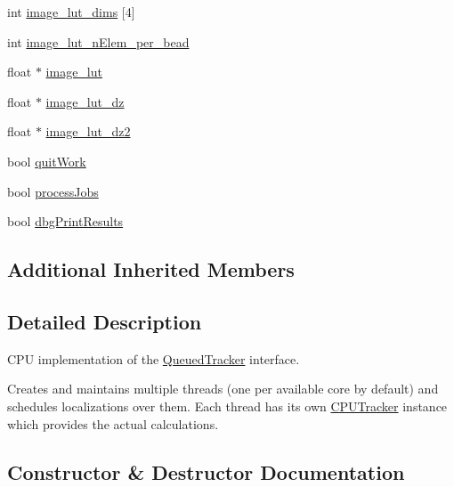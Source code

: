 \begin{DoxyCompactItemize}
\item 
int \hyperlink{class_queued_c_p_u_tracker_a9efbfed3c81e70cb64e6e0d30d2c5b18}{image\+\_\+lut\+\_\+dims} \mbox{[}4\mbox{]}
\item 
int \hyperlink{class_queued_c_p_u_tracker_ac89ec6a24b361816350966d575e0b133}{image\+\_\+lut\+\_\+n\+Elem\+\_\+per\+\_\+bead}
\item 
float $\ast$ \hyperlink{class_queued_c_p_u_tracker_af7ac0b5f68de59f97fa76a02c11763fe}{image\+\_\+lut}
\item 
float $\ast$ \hyperlink{class_queued_c_p_u_tracker_a0bc269c162625aecef4044cce5368bf5}{image\+\_\+lut\+\_\+dz}
\item 
float $\ast$ \hyperlink{class_queued_c_p_u_tracker_a4d61769a342c1af2827d3ede87d5489f}{image\+\_\+lut\+\_\+dz2}
\item 
bool \hyperlink{class_queued_c_p_u_tracker_ad6320a2a77d100f856df62c2dd113ef3}{quit\+Work}
\item 
bool \hyperlink{class_queued_c_p_u_tracker_ad219fc82305fbf3678fea305f2728b24}{process\+Jobs}
\item 
bool \hyperlink{class_queued_c_p_u_tracker_aee09996116d3c5b082c03cb8e2e4d7c9}{dbg\+Print\+Results}
\end{DoxyCompactItemize}
\subsection*{Additional Inherited Members}


\subsection{Detailed Description}
C\+PU implementation of the \hyperlink{class_queued_tracker}{Queued\+Tracker} interface. 

Creates and maintains multiple threads (one per available core by default) and schedules localizations over them. Each thread has its own \hyperlink{class_c_p_u_tracker}{C\+P\+U\+Tracker} instance which provides the actual calculations. 

\subsection{Constructor \& Destructor Documentation}
